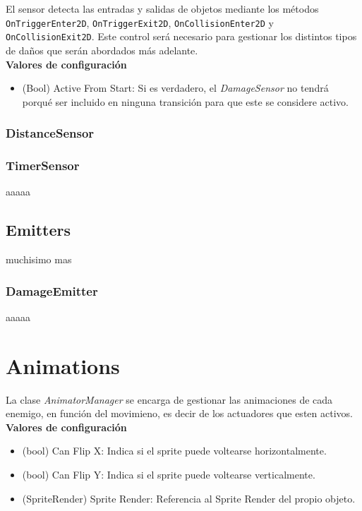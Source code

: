 El sensor detecta las entradas y salidas de objetos mediante los métodos \texttt{OnTriggerEnter2D}, \texttt{OnTriggerExit2D}, \texttt{OnCollisionEnter2D} y \texttt{OnCollisionExit2D}. Este control será necesario para gestionar los distintos tipos de daños que serán abordados más adelante.\\

\textbf{Valores de configuración}
\begin{itemize}
	\item (Bool) Active From Start: Si es verdadero, el \textit{DamageSensor} no tendrá porqué ser incluido en ninguna transición para que este se considere activo.
\end{itemize}

\subsubsection{DistanceSensor}

\subsubsection{TimerSensor}
aaaaa

\subsection{Emitters}
muchisimo mas
\subsubsection{DamageEmitter}
aaaaa

\section{Animations}
La clase \textit{AnimatorManager} se encarga de gestionar las animaciones de cada enemigo, en función del movimieno, es decir de los actuadores que esten activos.\\

\textbf{Valores de configuración}
\begin{itemize}
	\item (bool) Can Flip X: Indica si el sprite puede voltearse horizontalmente.
	\item (bool) Can Flip Y: Indica si el sprite puede voltearse verticalmente. 
\item (SpriteRender) Sprite Render: Referencia al Sprite Render del propio objeto.
\end{itemize}

